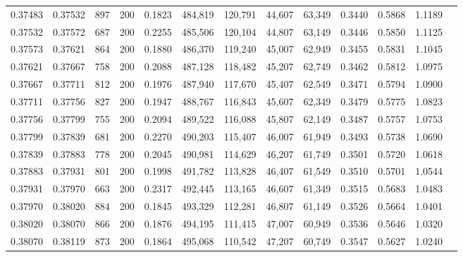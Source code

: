 \begin{tabular}{rrrrrrrrrrrrr}
0.37483 & 0.37532 &    897 & 200 &                                     0.1823 & 484,819 & 120,791 &  44,607 &  63,349 & 0.3440 & 0.5868 & 1.1189 \\
0.37532 & 0.37572 &    687 & 200 &                                     0.2255 & 485,506 & 120,104 &  44,807 &  63,149 & 0.3446 & 0.5850 & 1.1125 \\
0.37573 & 0.37621 &    864 & 200 &                                     0.1880 & 486,370 & 119,240 &  45,007 &  62,949 & 0.3455 & 0.5831 & 1.1045 \\
0.37621 & 0.37667 &    758 & 200 &                                     0.2088 & 487,128 & 118,482 &  45,207 &  62,749 & 0.3462 & 0.5812 & 1.0975 \\
0.37667 & 0.37711 &    812 & 200 &                                     0.1976 & 487,940 & 117,670 &  45,407 &  62,549 & 0.3471 & 0.5794 & 1.0900 \\
0.37711 & 0.37756 &    827 & 200 &                                     0.1947 & 488,767 & 116,843 &  45,607 &  62,349 & 0.3479 & 0.5775 & 1.0823 \\
0.37756 & 0.37799 &    755 & 200 &                                     0.2094 & 489,522 & 116,088 &  45,807 &  62,149 & 0.3487 & 0.5757 & 1.0753 \\
0.37799 & 0.37839 &    681 & 200 &                                     0.2270 & 490,203 & 115,407 &  46,007 &  61,949 & 0.3493 & 0.5738 & 1.0690 \\
0.37839 & 0.37883 &    778 & 200 &                                     0.2045 & 490,981 & 114,629 &  46,207 &  61,749 & 0.3501 & 0.5720 & 1.0618 \\
0.37883 & 0.37931 &    801 & 200 &                                     0.1998 & 491,782 & 113,828 &  46,407 &  61,549 & 0.3510 & 0.5701 & 1.0544 \\
0.37931 & 0.37970 &    663 & 200 &                                     0.2317 & 492,445 & 113,165 &  46,607 &  61,349 & 0.3515 & 0.5683 & 1.0483 \\
0.37970 & 0.38020 &    884 & 200 &                                     0.1845 & 493,329 & 112,281 &  46,807 &  61,149 & 0.3526 & 0.5664 & 1.0401 \\
0.38020 & 0.38070 &    866 & 200 &                                     0.1876 & 494,195 & 111,415 &  47,007 &  60,949 & 0.3536 & 0.5646 & 1.0320 \\
0.38070 & 0.38119 &    873 & 200 &                                     0.1864 & 495,068 & 110,542 &  47,207 &  60,749 & 0.3547 & 0.5627 & 1.0240 \\

\end{tabular}
